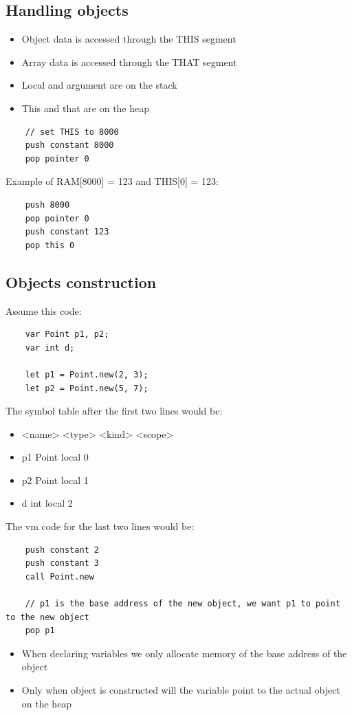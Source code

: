 \documentclass[12pt,a4paper]{article}
\begin{document}
\subsection{Handling objects}
\begin{itemize}
    \item Object data is accessed through the THIS segment
    \item Array data is accessed through the THAT segment
    \item Local and argument are on the stack
    \item This and that are on the heap
\end{itemize}
\begin{verbatim}
    // set THIS to 8000
    push constant 8000
    pop pointer 0
\end{verbatim}
Example of RAM[8000] = 123 and THIS[0] = 123:
\begin{verbatim}
    push 8000
    pop pointer 0
    push constant 123
    pop this 0
\end{verbatim}

\subsection{Objects construction}
Assume this code:
\begin{verbatim}
    var Point p1, p2;
    var int d;

    let p1 = Point.new(2, 3);
    let p2 = Point.new(5, 7);
\end{verbatim}
The symbol table after the first two lines would be:
\begin{itemize}
    \item <name> <type> <kind> <scope> 
    \item p1 Point local 0
    \item p2 Point local 1
    \item d int local 2
\end{itemize}
The vm code for the last two lines would be:
\begin{verbatim}
    push constant 2
    push constant 3
    call Point.new 
    
    // p1 is the base address of the new object, we want p1 to point to the new object
    pop p1
\end{verbatim}
\begin{itemize}
    \item When declaring variables we only allocate memory of the base address of the object
    \item Only when object is constructed will the variable point to the actual object on the heap
\end{itemize}
\end{document}
